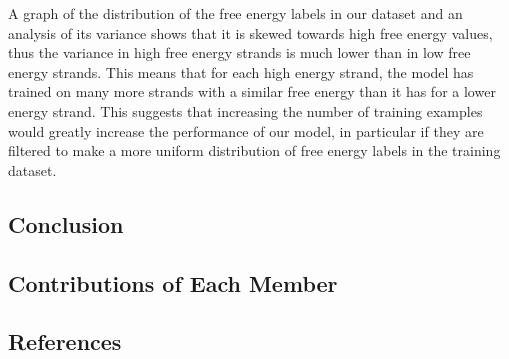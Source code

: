 \documentclass{article}
\begin{document}
A graph of the distribution of the free energy labels in our dataset and an analysis of its variance shows that it is skewed towards high free energy values, thus the variance in high free energy strands is much lower than in low free energy strands. This means that for each high energy strand, the model has trained on many more strands with a similar free energy than it has for a lower energy strand. This suggests that increasing the number of training examples would greatly increase the performance of our model, in particular if they are filtered to make a more uniform distribution of free energy labels in the training dataset.
\subsection{Conclusion}
\subsection{Contributions of Each Member}
\subsection{References}
\end{document}
